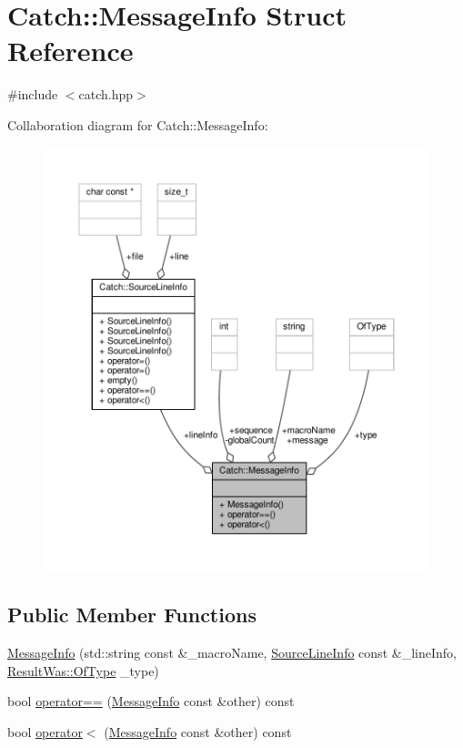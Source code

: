 \hypertarget{struct_catch_1_1_message_info}{\section{Catch\-:\-:Message\-Info Struct Reference}
\label{struct_catch_1_1_message_info}
}


{\ttfamily \#include $<$catch.\-hpp$>$}



Collaboration diagram for Catch\-:\-:Message\-Info\-:
\nopagebreak
\begin{figure}[H]
\begin{center}
\leavevmode
\includegraphics[width=350pt]{struct_catch_1_1_message_info__coll__graph}
\end{center}
\end{figure}
\subsection*{Public Member Functions}
\begin{DoxyCompactItemize}
\item 
\hyperlink{struct_catch_1_1_message_info_a2e336c33ebef7af3c1bbae6a56e14f8a}{Message\-Info} (std\-::string const \&\-\_\-macro\-Name, \hyperlink{struct_catch_1_1_source_line_info}{Source\-Line\-Info} const \&\-\_\-line\-Info, \hyperlink{struct_catch_1_1_result_was_a624e1ee3661fcf6094ceef1f654601ef}{Result\-Was\-::\-Of\-Type} \-\_\-type)
\item 
bool \hyperlink{struct_catch_1_1_message_info_a30fe117138e568c5a9dfdabb7de6e790}{operator==} (\hyperlink{struct_catch_1_1_message_info}{Message\-Info} const \&other) const 
\item 
bool \hyperlink{struct_catch_1_1_message_info_a7a2b1ec3772cd35176e2ee25a94be16a}{operator$<$} (\hyperlink{struct_catch_1_1_message_info}{Message\-Info} const \&other) const 
\end{DoxyCompactItemize}
